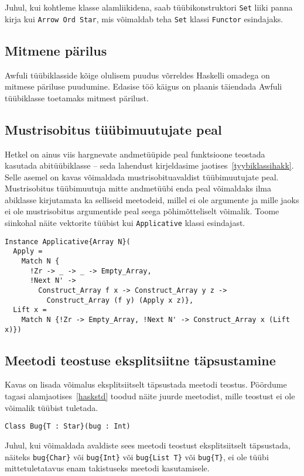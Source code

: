 \documentclass[12pt]{article}
\begin{document}
        Juhul, kui kohtleme klasse alamliikidena, saab tüübikonstruktori \verb!Set! liiki panna kirja kui \verb!Arrow Ord Star!, mis võimaldab teha \verb!Set! klassi \verb!Functor! esindajaks.
    \subsection{Mitmene pärilus}
      Awfuli tüübiklasside kõige olulisem puudus võrreldes Haskelli omadega on mitmese päriluse puudumine. Edasise töö käigus on plaanis täiendada Awfuli tüübiklasse toetamaks mitmest pärilust.
    \subsection{Mustrisobitus tüübimuutujate peal}\label{eemaldadatyybiklassihakk}
      Hetkel on ainus viis hargnevate andmetüüpide peal funktsioone teostada kasutada abitüübiklasse -- seda lahendust kirjeldasime jaotises~\ref{tyybiklassihakk}. Selle asemel on kavas võimaldada mustrisobituavaldist tüübimuutujate peal. Mustrisobitus tüübimuutuja mitte andmetüübi enda peal võimaldaks ilma abiklasse kirjutamata ka selliseid meetodeid, millel ei ole argumente ja mille jaoks ei ole mustrisobitus argumentide peal seega põhimõtteliselt võimalik. Toome siinkohal näite vektorite tüübist kui \verb!Applicative! klassi esindajast.

      \begin{verbatim}Instance Applicative{Array N}(
  Apply =
    Match N {
      !Zr -> _ -> _ -> Empty_Array,
      !Next N' ->
        Construct_Array f x -> Construct_Array y z ->
          Construct_Array (f y) (Apply x z)},
  Lift x =
    Match N {!Zr -> Empty_Array, !Next N' -> Construct_Array x (Lift x)})\end{verbatim}
    \subsection{Meetodi teostuse eksplitsiitne täpsustamine}
      Kavas on lisada võimalus eksplitsiitselt täpsustada meetodi teostus. Pöördume tagasi alamjaotises~\ref{haskstd} toodud näite juurde meetodist, mille teostust ei ole võimalik tüübist tuletada.

      \begin{verbatim}Class Bug{T : Star}(bug : Int)\end{verbatim}

      Juhul, kui võimaldada avaldiste sees meetodi teostust eksplitsiitselt täpsustada, näiteks \verb!bug{Char}! või \verb!bug{Int}! või \verb!bug{List T}! või \verb!bug{T}!, ei ole tüübi mittetuletatavus enam takistuseks meetodi kasutamisele.
\end{document}
